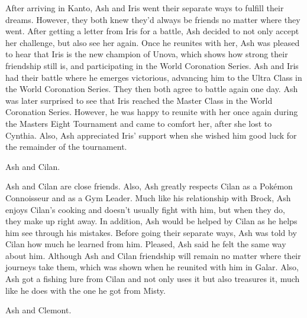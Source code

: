 \documentclass[a4paper,12pt]{article}
\begin{document}
After arriving in Kanto, Ash and Iris went their separate ways to fulfill their dreams. However, they both knew they'd always be friends no matter where they went. After getting a letter from Iris for a battle, Ash decided to not only accept her challenge, but also see her again. Once he reunites with her, Ash was pleased to hear that Iris is the new champion of Unova, which shows how strong their friendship still is, and participating in the World Coronation Series. Ash and Iris had their battle where he emerges victorious, advancing him to the Ultra Class in the World Coronation Series. They then both agree to battle again one day. Ash was later surprised to see that Iris reached the Master Class in the World Coronation Series. However, he was happy to reunite with her once again during the Masters Eight Tournament and came to comfort her, after she lost to Cynthia. Also, Ash appreciated Iris' support when she wished him good luck for the remainder of the tournament.\\ \par \vspace{0.5cm}

Ash and Cilan.\\ \par \vspace{0.5cm}

Ash and Cilan are close friends. Also, Ash greatly respects Cilan as a Pokémon Connoisseur and as a Gym Leader. Much like his relationship with Brock, Ash enjoys Cilan's cooking and doesn't usually fight with him, but when they do, they make up right away. In addition, Ash would be helped by Cilan as he helps him see through his mistakes. Before going their separate ways, Ash was told by Cilan how much he learned from him. Pleased, Ash said he felt the same way about him. Although Ash and Cilan friendship will remain no matter where their journeys take them, which was shown when he reunited with him in Galar. Also, Ash got a fishing lure from Cilan and not only uses it but also treasures it, much like he does with the one he got from Misty.\\ \par \vspace{0.5cm}

Ash and Clemont.\\ \par \vspace{0.5cm}
\end{document}
